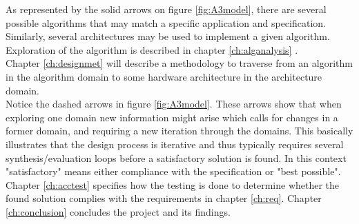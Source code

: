 As represented by the solid arrows on figure \vref{fig:A3model}, there are several possible algorithms that may match a specific application and  specification. Similarly, several architectures may be used to implement a given algorithm. Exploration of the algorithm is described in chapter \vref{ch:alganalysis} .\\

Chapter \vref{ch:designmet} will describe a methodology to traverse from an algorithm in the algorithm domain to some hardware architecture in the architecture domain.\\

Notice the dashed arrows in figure \vref{fig:A3model}. These arrows show that when exploring one domain new information might arise which calls for changes in a former domain, and requiring a new iteration through the domains. This basically illustrates that the design process is iterative and thus typically requires several synthesis/evaluation loops before a satisfactory solution is found. In this context "satisfactory" means either compliance with the specification or "best possible".\\

Chapter \vref{ch:acctest} specifies how the testing is done to determine whether the found solution complies with the requirements in chapter \vref{ch:req}. Chapter \vref{ch:conclusion} concludes the project and its findings. 